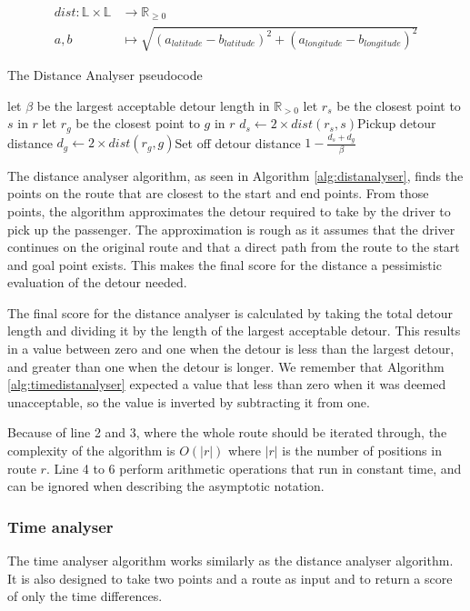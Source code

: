 \begin{align*}
	dist : \mathbb{L}\times\mathbb{L} &\rightarrow \mathbb{R}_{\geq 0}\\
	a, b &\mapsto \sqrt{(a_{latitude} - b_{latitude})^2 + (a_{longitude} - b_{longitude})^2}
\end{align*}

\begin{algorithm}
	\caption{The Distance Analyser pseudocode}
	\label{alg:distanalyser}
	\begin{algorithmic}[1]
		\Require 
		\Statex let $\beta$ be the largest acceptable detour length in $\mathbb{R}_{>0}$ 
		\Statex 
			\State let $r_s$ be the closest point to $s$ in $r$
			\State let $r_g$ be the closest point to $g$ in $r$
			\State $d_s\gets 2\times dist(r_s, s)$\Comment Pickup detour distance
			\State $d_g\gets 2\times dist(r_g, g)$\Comment Set off detour distance
			\State\Return $1-\frac{d_s + d_g}{\beta}$
		\EndFunction
	\end{algorithmic}
\end{algorithm}

The distance analyser algorithm, as seen in Algorithm \ref{alg:distanalyser}, finds the points on the route that are closest to the start and end points.
From those points, the algorithm approximates the detour required to take by the driver to pick up the passenger.
The approximation is rough as it assumes that the driver continues on the original route and that a direct path from the route to the start and goal point exists.
This makes the final score for the distance a pessimistic evaluation of the detour needed.

The final score for the distance analyser is calculated by taking the total detour length and dividing it by the length of the largest acceptable detour.
This results in a value between zero and one when the detour is less than the largest detour, and greater than one when the detour is longer.
We remember that Algorithm \ref{alg:timedistanalyser} expected a value that less than zero when it was deemed unacceptable, so the value is inverted by subtracting it from one.

Because of line 2 and 3, where the whole route should be iterated through, the complexity of the algorithm is $O(|r|)$ where $|r|$ is the number of positions in route $r$.
Line 4 to 6 perform arithmetic operations that run in constant time, and can be ignored when describing the asymptotic notation.

\subsubsection{Time analyser}
The time analyser algorithm works similarly as the distance analyser algorithm. 
It is also designed to take two points and a route as input and to return a score of only the time differences.

